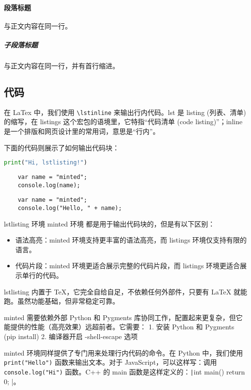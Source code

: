 \documentclass{ctexart}
\begin{document}
\paragraph{段落标题}与正文内容在同一行。

\subparagraph{子段落标题}与正文内容在同一行，并有首行缩进。

\subsection{代码}
在 LaTex 中，我们使用 \lstinline|\lstinline| 来输出行内代码。lst 是 listing (列表、清单) 的缩写，在 listings 这个宏包的语境里，它特指“代码清单 (code listing)”；inline 是一个排版和网页设计里的常用词，意思是“行内”。

下面的代码则展示了如何输出代码块：
\begin{lstlisting}[language=Python]
print("Hi, lstlisting!")
\end{lstlisting}

\begin{verbatim}
    var name = "minted";
    console.log(name);
\end{verbatim}

\begin{verbatim}
    var name = "minted";
    console.log("Hello, " + name);
\end{verbatim}

lstlisting 环境 minted 环境 都是用于输出代码块的，但是有以下区别：
\begin{itemize}
    \item 语法高亮：minted 环境支持更丰富的语法高亮，而 listings 环境仅支持有限的语言。
    \item 代码片段：minted 环境更适合展示完整的代码片段，而 listings 环境更适合展示单行的代码。
\end{itemize}

lstlisting 内置于 TeX，它完全自给自足，不依赖任何外部件，只要有 LaTeX 就能跑。虽然功能基础，但非常稳定可靠。

minted 需要依赖外部 Python 和 Pygments 库协同工作，配置起来更复杂，但它能提供的性能（高亮效果）远超前者。它需要： 1. 安装 Python 和 Pygments (pip install) 2. 编译器开启 -shell-escape 选项

minted 环境同样提供了专门用来处理行内代码的命令。在 Python 中，我们使用 \texttt{print("Hello")} 函数来输出文本。对于 JavaScript，可以这样写：调用 \texttt{console.log("Hi")} 函数。C++ 的 main 函数是这样定义的：\texttt|int main() { return 0; }|。
\end{document}
